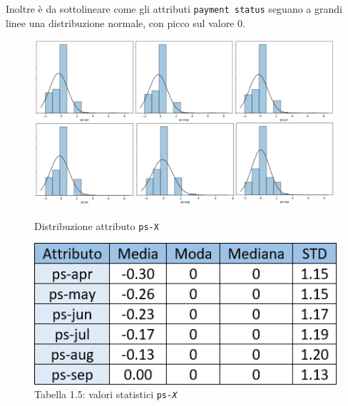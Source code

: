 Inoltre \`e da sottolineare come gli attributi \texttt{payment status} seguano a grandi linee una distribuzione normale, con picco sul valore 0.
\begin{figure}[!htb]
  \includegraphics[width=\linewidth]{img/ps-distribution.png}
  \caption{Distribuzione attributo \texttt{ps-X}}\label{ps-dist}
\endminipage\hfill
{}
  \includegraphics[width=\linewidth]{img/ps-stat.png}
\captionsetup{labelformat=empty}
\caption{Tabella 1.5: valori statistici \texttt{ps-\textit{X}}}
\label{ps-stat}
\endminipage\hfill
\end{figure}


